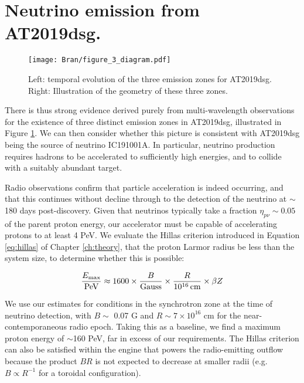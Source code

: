 \section{Neutrino emission from AT2019dsg.} 

\begin{figure}[!ht]
	\texttt{[image: Bran/figure\_3\_diagram.pdf]}
	\caption{Left: temporal evolution of the three emission zones for AT2019dsg. Right: Illustration of the geometry of these three zones.}
	\label{fig:bran_diagram}
\end{figure}

There is thus strong evidence derived purely from multi-wavelength observations for the existence of three distinct emission zones in AT2019dsg, illustrated in Figure \ref{fig:bran_diagram}. We can then consider whether this picture is consistent with AT2019dsg being the source of neutrino IC191001A. In particular, neutrino production requires hadrons to be accelerated to sufficiently high energies, and to collide with a suitably abundant target. 


Radio observations confirm that particle acceleration is indeed occurring, and that this continues without decline through to the detection of the neutrino at $\sim$180 days post-discovery. Given that neutrinos typically take a fraction $\eta_{p\nu} \sim 0.05$ of the parent proton energy, our accelerator must be capable of accelerating protons to at least 4 PeV. We evaluate the Hillas criterion  introduced in Equation \ref{eq:hillas} of Chapter \ref{ch:theory}, that the proton Larmor radius be less than the system size, to determine whether this is possible:

\begin{equation}
\frac{E_{ \textup{max}}}{ \textup{PeV}} \approx
1600 \times \frac{B}{ \textup{Gauss}} \times \frac{R}{10^{16} \,  \textup{cm}} \times
\beta Z
\end{equation}

We use our estimates for conditions in the synchrotron zone at the time of neutrino detection, with $B \sim$ 0.07 G and $R \sim 7 \times 10^{16}$ cm for the near-contemporaneous radio epoch. Taking this as a baseline, we find a maximum proton energy of $\sim$160 PeV, far in excess of our requirements. The Hillas criterion can also be satisfied within the engine that powers the radio-emitting outflow because the product $BR$ is not expected to decrease at smaller radii (e.g. $B \propto R^{-1}$ for a toroidal configuration). 

